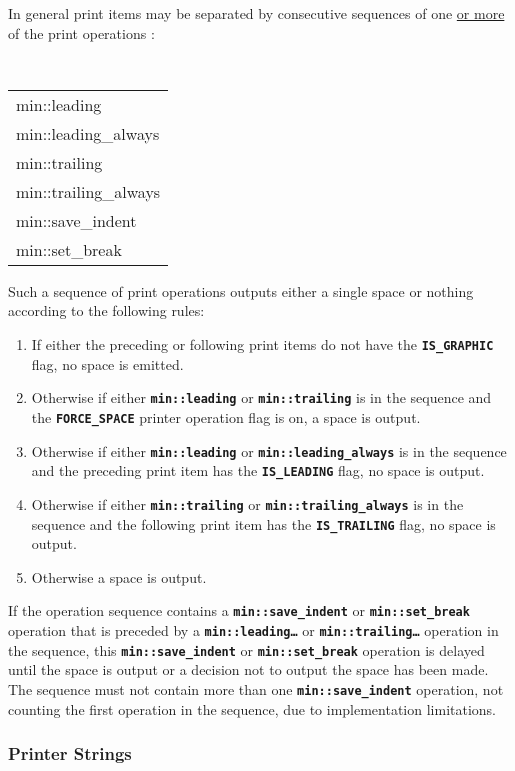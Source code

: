 \documentclass[12pt]{article}
\newcommand{\TT}[1]{{\tt \bfseries #1}}
\newcommand{\TTALL}{\tt \bfseries}
\newcommand{\EOL}{\penalty \exhyphenpenalty}
\begin{document}
In general print items may be separated by
consecutive sequences of one \underline{or more} of the print operations
\label{LEADING-TRAILING-RULES}:
\begin{center}
\TTALL
\begin{tabular}{l}
min::leading \\
min::leading\_always \\
min::trailing \\
min::trailing\_always \\
min::save\_indent \\
min::set\_break \\
\end{tabular}
\end{center}
Such a sequence of print operations outputs either a single space or
nothing according to the following rules:
\begin{enumerate}
\item If either the preceding or following print items do not have the
\TT{IS\_\EOL GRAPHIC} flag, no space is emitted.
\item Otherwise if either \TT{min::leading} or \TT{min::trailing}
is in the sequence and the \TT{FORCE\_\EOL SPACE} printer\label{FORCE_SPACE}
operation flag is on, a space is output.
\item Otherwise if either \TT{min::leading} or \TT{min::leading\_\EOL always}
is in the sequence and the preceding print item has the \TT{IS\_\EOL LEADING}
flag, no space is output.
\item Otherwise if either \TT{min::trailing} or \TT{min::trailing\_\EOL always}
is in the sequence and the following print item has the \TT{IS\_\EOL TRAILING}
flag, no space is output.
\item Otherwise a space is output.
\end{enumerate}

If the operation sequence contains a
\TT{min::save\_indent}\label{LEADING-TRAILING-SAVE-INDENT}
or \TT{min::set\_break} operation\label{LEADING-TRAILING-SET-BREAK}
that is preceded by a \TT{min::leading\ldots} or \TT{min::trailing\ldots}
operation in the sequence, this
\TT{min::save\_indent} or \TT{min::set\_break} operation
is delayed until the space is output or a decision not to output
the space has been made.
The sequence must not contain more than one \TT{min::save\_indent}
operation, not counting the first operation in the sequence,
due to implementation limitations.


\subsubsection{Printer Strings}
\label{PRINTER-STRINGS}
\end{document}
